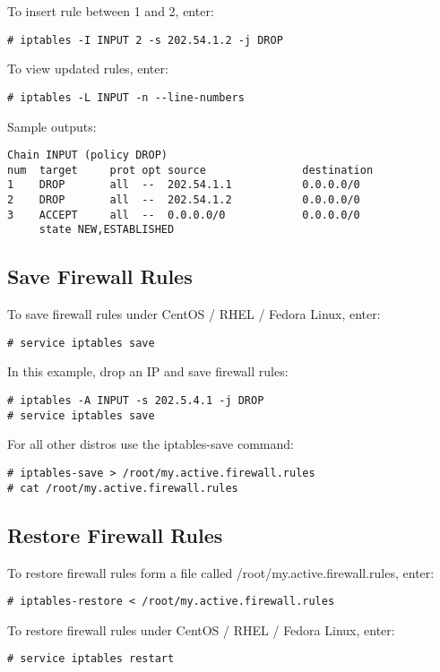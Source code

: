 To insert rule between 1 and 2, enter:
\begin{verbatim}
# iptables -I INPUT 2 -s 202.54.1.2 -j DROP
\end{verbatim}

To view updated rules, enter:
\begin{verbatim}
# iptables -L INPUT -n --line-numbers
\end{verbatim}

Sample outputs:
\begin{verbatim}
Chain INPUT (policy DROP)
num  target     prot opt source               destination
1    DROP       all  --  202.54.1.1           0.0.0.0/0
2    DROP       all  --  202.54.1.2           0.0.0.0/0
3    ACCEPT     all  --  0.0.0.0/0            0.0.0.0/0      
     state NEW,ESTABLISHED
\end{verbatim}

\subsection{Save Firewall Rules}

To save firewall rules under CentOS / RHEL / Fedora Linux, enter:
\begin{verbatim}
# service iptables save
\end{verbatim}

In this example, drop an IP and save firewall rules:
\begin{verbatim}
# iptables -A INPUT -s 202.5.4.1 -j DROP
# service iptables save
\end{verbatim}

For all other distros use the iptables-save command:
\begin{verbatim}
# iptables-save > /root/my.active.firewall.rules
# cat /root/my.active.firewall.rules
\end{verbatim}

\subsection{Restore Firewall Rules}

To restore firewall rules form a file called 
/root/my.active.firewall.rules, enter:
\begin{verbatim}
# iptables-restore < /root/my.active.firewall.rules
\end{verbatim}

To restore firewall rules under CentOS / RHEL / Fedora Linux, enter:
\begin{verbatim}
# service iptables restart
\end{verbatim}

